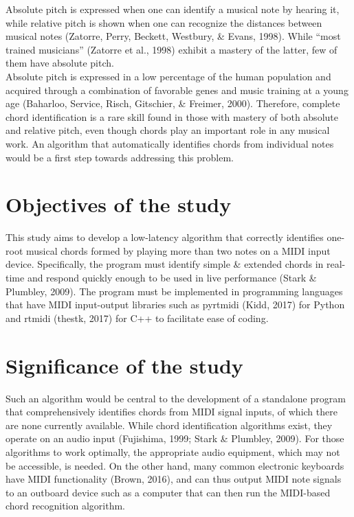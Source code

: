 \documentclass{article}
\begin{document}
	Absolute pitch is expressed when one can identify a musical note by hearing it, while relative pitch is shown when one can recognize the distances between musical notes (Zatorre, Perry, Beckett, Westbury, \& Evans, 1998). While “most trained musicians” (Zatorre et al., 1998) exhibit a mastery of the latter, few of them have absolute pitch. \\
	
	Absolute pitch is expressed in a low percentage of the human population and acquired through a combination of favorable genes and music training at a young age (Baharloo, Service, Risch, Gitschier, \& Freimer, 2000). Therefore, complete chord identification is a rare skill found in those with mastery of both absolute and relative pitch, even though chords play an important role in any musical work. An algorithm that automatically identifies chords from individual notes would be a first step towards addressing this problem.\\
	
	\section{Objectives of the study}
	This study aims to develop a low-latency algorithm that correctly identifies one-root musical chords formed by playing more than two notes on a MIDI input device. Specifically, the program must identify simple \& extended chords in real-time and respond quickly enough to be used in live performance (Stark \& Plumbley, 2009). The program must be implemented in programming languages that have MIDI input-output libraries such as pyrtmidi (Kidd, 2017) for Python and rtmidi (thestk, 2017) for C++ to facilitate ease of coding.\\
	
	\section{Significance of the study}
	Such an algorithm would be central to the development of a standalone program that comprehensively identifies chords from MIDI signal inputs, of which there are none currently available. While chord identification algorithms exist, they operate on an audio input (Fujishima, 1999; Stark \& Plumbley, 2009). For those algorithms to work optimally, the appropriate audio equipment, which may not be accessible, is needed. On the other hand, many common electronic keyboards have MIDI functionality (Brown, 2016), and can thus output MIDI note signals to an outboard device such as a computer that can then run the MIDI-based chord recognition algorithm. \\
	
\end{document}
